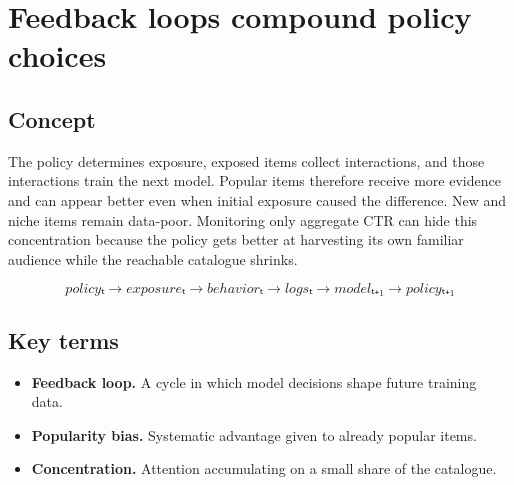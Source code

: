 \section{Feedback loops compound policy choices}

\begin{abstract}
Today’s ranking becomes tomorrow’s evidence, so small advantages can grow automatically.
\end{abstract}

\subsection{Concept}
The policy determines exposure, exposed items collect interactions, and those interactions train the next model. Popular items therefore receive more evidence and can appear better even when initial exposure caused the difference. New and niche items remain data-poor. Monitoring only aggregate CTR can hide this concentration because the policy gets better at harvesting its own familiar audience while the reachable catalogue shrinks.

\begin{equation*}
policyₜ \rightarrow exposureₜ \rightarrow behaviorₜ \rightarrow logsₜ \rightarrow modelₜ₊₁ \rightarrow policyₜ₊₁
\end{equation*}

\subsection{Key terms}
\begin{itemize}
\item \textbf{Feedback loop.} A cycle in which model decisions shape future training data.
\item \textbf{Popularity bias.} Systematic advantage given to already popular items.
\item \textbf{Concentration.} Attention accumulating on a small share of the catalogue.
\end{itemize}
